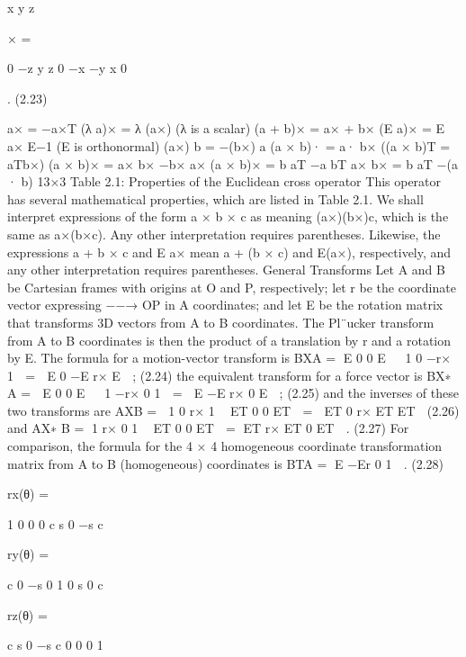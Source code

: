 x y z

× =

0 −z y z 0 −x −y x 0

. (2.23)

a× = −a×T (λ a)× = λ (a×) (λ is a scalar) (a + b)× = a× + b× (E a)× = E a× E−1 (E is orthonormal) (a×) b = −(b×) a (a × b)· = a· b× ((a × b)T = aTb×) (a × b)× = a× b× −b× a× (a × b)× = b aT −a bT a× b× = b aT −(a · b) 13×3 Table 2.1: Properties of the Euclidean cross operator This operator has several mathematical properties, which are listed in Table 2.1. We shall interpret expressions of the form a × b × c as meaning (a×)(b×)c, which is the same as a×(b×c). Any other interpretation requires parentheses. Likewise, the expressions a + b × c and E a× mean a + (b × c) and E(a×), respectively, and any other interpretation requires parentheses. General Transforms Let A and B be Cartesian frames with origins at O and P, respectively; let r be the coordinate vector expressing −−→ OP in A coordinates; and let E be the rotation matrix that transforms 3D vectors from A to B coordinates. The Pl¨ucker transform from A to B coordinates is then the product of a translation by r and a rotation by E. The formula for a motion-vector transform is BXA = E 0 0 E   1 0 −r× 1  =  E 0 −E r× E  ; (2.24) the equivalent transform for a force vector is BX∗ A =  E 0 0 E   1 −r× 0 1  =  E −E r× 0 E  ; (2.25) and the inverses of these two transforms are AXB =  1 0 r× 1  ET 0 0 ET  =  ET 0 r× ET ET  (2.26) and AX∗ B = 1 r× 0 1  ET 0 0 ET  = ET r× ET 0 ET  . (2.27) For comparison, the formula for the 4 × 4 homogeneous coordinate transformation matrix from A to B (homogeneous) coordinates is BTA = E −Er 0 1  . (2.28)

rx(θ) =

1 0 0 0 c s 0 −s c

ry(θ) =

c 0 −s 0 1 0 s 0 c

rz(θ) =

c s 0 −s c 0 0 0 1

